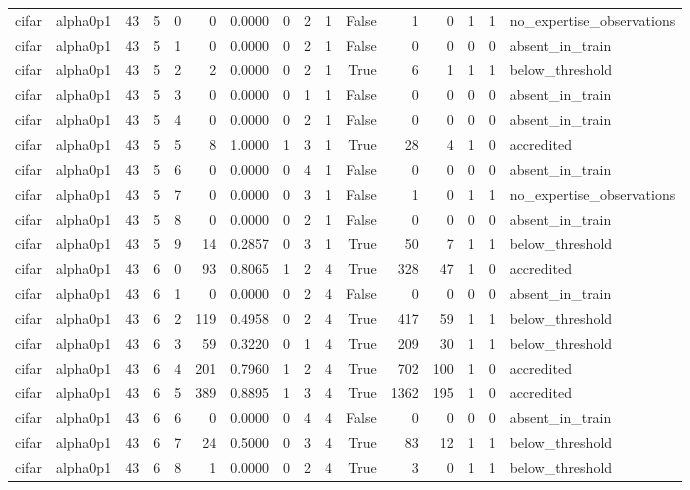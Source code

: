 \begin{tabular}{llrrrrrrrrrrrrrl}
cifar & alpha0p1 & 43 & 5 & 0 & 0 & 0.0000 & 0 & 2 & 1 & False & 1 & 0 & 1 & 1 & no\_expertise\_observations \\
cifar & alpha0p1 & 43 & 5 & 1 & 0 & 0.0000 & 0 & 2 & 1 & False & 0 & 0 & 0 & 0 & absent\_in\_train \\
cifar & alpha0p1 & 43 & 5 & 2 & 2 & 0.0000 & 0 & 2 & 1 & True & 6 & 1 & 1 & 1 & below\_threshold \\
cifar & alpha0p1 & 43 & 5 & 3 & 0 & 0.0000 & 0 & 1 & 1 & False & 0 & 0 & 0 & 0 & absent\_in\_train \\
cifar & alpha0p1 & 43 & 5 & 4 & 0 & 0.0000 & 0 & 2 & 1 & False & 0 & 0 & 0 & 0 & absent\_in\_train \\
cifar & alpha0p1 & 43 & 5 & 5 & 8 & 1.0000 & 1 & 3 & 1 & True & 28 & 4 & 1 & 0 & accredited \\
cifar & alpha0p1 & 43 & 5 & 6 & 0 & 0.0000 & 0 & 4 & 1 & False & 0 & 0 & 0 & 0 & absent\_in\_train \\
cifar & alpha0p1 & 43 & 5 & 7 & 0 & 0.0000 & 0 & 3 & 1 & False & 1 & 0 & 1 & 1 & no\_expertise\_observations \\
cifar & alpha0p1 & 43 & 5 & 8 & 0 & 0.0000 & 0 & 2 & 1 & False & 0 & 0 & 0 & 0 & absent\_in\_train \\
cifar & alpha0p1 & 43 & 5 & 9 & 14 & 0.2857 & 0 & 3 & 1 & True & 50 & 7 & 1 & 1 & below\_threshold \\
cifar & alpha0p1 & 43 & 6 & 0 & 93 & 0.8065 & 1 & 2 & 4 & True & 328 & 47 & 1 & 0 & accredited \\
cifar & alpha0p1 & 43 & 6 & 1 & 0 & 0.0000 & 0 & 2 & 4 & False & 0 & 0 & 0 & 0 & absent\_in\_train \\
cifar & alpha0p1 & 43 & 6 & 2 & 119 & 0.4958 & 0 & 2 & 4 & True & 417 & 59 & 1 & 1 & below\_threshold \\
cifar & alpha0p1 & 43 & 6 & 3 & 59 & 0.3220 & 0 & 1 & 4 & True & 209 & 30 & 1 & 1 & below\_threshold \\
cifar & alpha0p1 & 43 & 6 & 4 & 201 & 0.7960 & 1 & 2 & 4 & True & 702 & 100 & 1 & 0 & accredited \\
cifar & alpha0p1 & 43 & 6 & 5 & 389 & 0.8895 & 1 & 3 & 4 & True & 1362 & 195 & 1 & 0 & accredited \\
cifar & alpha0p1 & 43 & 6 & 6 & 0 & 0.0000 & 0 & 4 & 4 & False & 0 & 0 & 0 & 0 & absent\_in\_train \\
cifar & alpha0p1 & 43 & 6 & 7 & 24 & 0.5000 & 0 & 3 & 4 & True & 83 & 12 & 1 & 1 & below\_threshold \\
cifar & alpha0p1 & 43 & 6 & 8 & 1 & 0.0000 & 0 & 2 & 4 & True & 3 & 0 & 1 & 1 & below\_threshold \\

\end{tabular}
